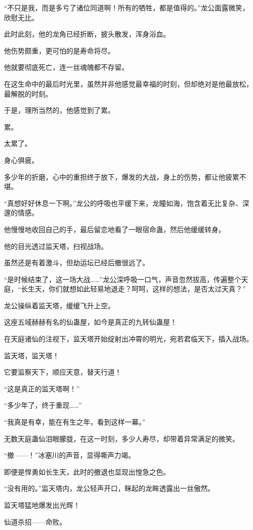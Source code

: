 \begin{this_body}
“不只是我，而是多亏了诸位同道啊！所有的牺牲，都是值得的。”龙公面露微笑，欣慰无比。

此时此刻，他的龙角已经折断，披头散发，浑身浴血。

他伤势颇重，更可怕的是寿命将尽。

他就要彻底死亡，连一丝魂魄都不存留。

在这生命中的最后时光里，虽然并非他感觉最幸福的时刻，但却绝对是他最放松，最解脱的时刻。

于是，理所当然的，他感觉到了累。

累。

太累了。

身心俱疲。

多少年的折磨，心中的重担终于放下，爆发的大战，身上的伤势，都让他疲累不堪。

“真想好好休息一下啊。”龙公的呼吸也平缓下来，龙瞳如海，饱含着无比复杂、深邃的情感。

他慢慢地收回自己的手，最后留恋地看了一眼宿命蛊，然后他缓缓转身。

他的目光透过监天塔，扫视战场。

虽然还是有着激斗，但劫运坛已经后撤很远了。

“是时候结束了，这一场大战……”龙公深呼吸一口气，声音忽然拔高，传遍整个天庭，“长生天，你们就想如此轻易地退走？呵呵，这样的想法，是否太过天真？”

龙公操纵着监天塔，缓缓飞升上空。

这座五域赫赫有名的仙蛊屋，如今是真正的九转仙蛊屋！

在天庭诸仙的注视下，监天塔开始绽射出冲霄的明光，宛若君临天下，插入战场。

监天塔，监天塔！

它要监察天下，顺应天意，替天行道！

“这是真正的监天塔啊！”

“多少年了，终于重现……”

“我真是有幸，能在有生之年，看到这样一幕。”

无数天庭蛊仙泪眼朦胧，在这一时刻，多少人寿尽，却带着异常满足的微笑。

“撤——！”冰塞川的声音，显得嘶声力竭。

即便是悍勇如长生天，此时的撤退也显现出惶急之色。

“没有用的。”监天塔内，龙公轻声开口，眯起的龙眸透露出一丝傲然。

监天塔猛地爆发出光辉！

仙道杀招——命败。


\end{this_body}
